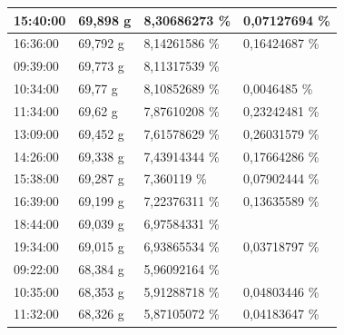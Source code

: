 \begin{table}[]
\begin{tabular}{llll}
		\multicolumn{1}{|l|}{15:40:00} & \multicolumn{1}{l|}{69,898 g} & \multicolumn{1}{l|}{8,30686273   \%} & \multicolumn{1}{l|}{0,07127694 \%} \\ \hline
		\multicolumn{1}{|l|}{16:36:00} & \multicolumn{1}{l|}{69,792 g} & \multicolumn{1}{l|}{8,14261586   \%} & \multicolumn{1}{l|}{0,16424687 \%} \\ \hline
		\multicolumn{1}{|l|}{\cellcolor[HTML]{A5A5A5}09:39:00} & \multicolumn{1}{l|}{69,773 g} & \multicolumn{1}{l|}{8,11317539   \%} &  \\ \hline
		\multicolumn{1}{|l|}{10:34:00} & \multicolumn{1}{l|}{69,77 g} & \multicolumn{1}{l|}{8,10852689   \%} & \multicolumn{1}{l|}{0,0046485 \%} \\ \hline
		\multicolumn{1}{|l|}{11:34:00} & \multicolumn{1}{l|}{69,62 g} & \multicolumn{1}{l|}{7,87610208   \%} & \multicolumn{1}{l|}{0,23242481 \%} \\ \hline
		\multicolumn{1}{|l|}{13:09:00} & \multicolumn{1}{l|}{69,452 g} & \multicolumn{1}{l|}{7,61578629   \%} & \multicolumn{1}{l|}{0,26031579 \%} \\ \hline
		\multicolumn{1}{|l|}{14:26:00} & \multicolumn{1}{l|}{69,338 g} & \multicolumn{1}{l|}{7,43914344   \%} & \multicolumn{1}{l|}{0,17664286 \%} \\ \hline
		\multicolumn{1}{|l|}{15:38:00} & \multicolumn{1}{l|}{69,287 g} & \multicolumn{1}{l|}{7,360119   \%} & \multicolumn{1}{l|}{0,07902444 \%} \\ \hline
		\multicolumn{1}{|l|}{16:39:00} & \multicolumn{1}{l|}{69,199 g} & \multicolumn{1}{l|}{7,22376311   \%} & \multicolumn{1}{l|}{0,13635589 \%} \\ \hline
		\multicolumn{1}{|l|}{18:44:00} & \multicolumn{1}{l|}{69,039 g} & \multicolumn{1}{l|}{6,97584331   \%} &  \\ \hline
		\multicolumn{1}{|l|}{19:34:00} & \multicolumn{1}{l|}{69,015 g} & \multicolumn{1}{l|}{6,93865534   \%} & \multicolumn{1}{l|}{0,03718797 \%} \\ \hline
		\multicolumn{1}{|l|}{\cellcolor[HTML]{A5A5A5}09:22:00} & \multicolumn{1}{l|}{68,384 g} & \multicolumn{1}{l|}{5,96092164   \%} &  \\ \hline
		\multicolumn{1}{|l|}{10:35:00} & \multicolumn{1}{l|}{68,353 g} & \multicolumn{1}{l|}{5,91288718   \%} & \multicolumn{1}{l|}{0,04803446 \%} \\ \hline
		\multicolumn{1}{|l|}{11:32:00} & \multicolumn{1}{l|}{68,326 g} & \multicolumn{1}{l|}{5,87105072   \%} & \multicolumn{1}{l|}{0,04183647 \%} \\ \hline

\end{tabular}
\end{table}
